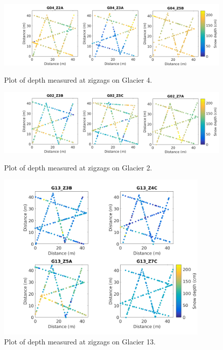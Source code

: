 \documentclass[12pt]{article}
\begin{document}
\begin{landscape}
\begin{figure}
	\centering
	\includegraphics[width = 23 cm]{ZigzagDepth_G04.png}\\
	\caption{Plot of depth measured at zigzags on Glacier 4.}
	\label{fig:ZZ_G04}
\end{figure}

\begin{figure}
	\centering
	\includegraphics[width = 23 cm]{ZigzagDepth_G02.png}\\
	\caption{Plot of depth measured at zigzags on Glacier 2.}
	\label{fig:ZZ_G02}
\end{figure}
\end{landscape}

\begin{figure}[H] 
	\centering
	 \includegraphics[width=0.9\textwidth]{ZigzagDepth_G13.png}%
	\caption{Plot of depth measured at zigzags on Glacier 13.}
	\label{fig:ZZ_G13}
\end{figure}
\end{document}
